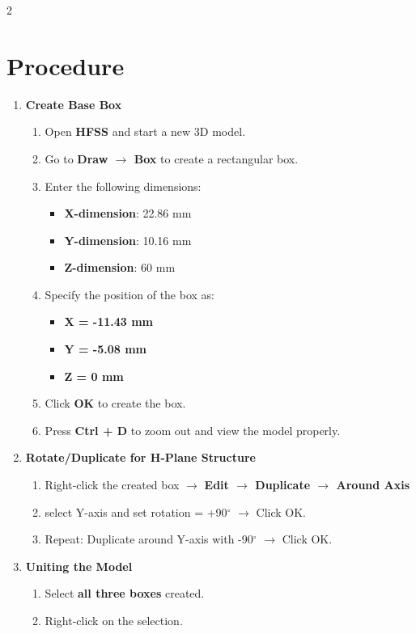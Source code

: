 \documentclass[11pt, a4paper]{article}
\begin{document}
\begin{multicols}{2}
\section*{Procedure}
\renewcommand{\labelenumii}{\alph{enumii}.}
\begin{enumerate}[leftmargin=*, itemsep=15pt]
	\item \textbf{Create Base Box}
	\begin{enumerate}
		\item Open \textbf{HFSS} and start a new 3D model.
		\item Go to \textbf{Draw $\rightarrow$ Box} to create a rectangular box.
		\item Enter the following dimensions:
		\begin{itemize}
			\item \textbf{X-dimension}: 22.86 mm
			\item \textbf{Y-dimension}: 10.16 mm
			\item \textbf{Z-dimension}: 60 mm
		\end{itemize}
		\item Specify the position of the box as:
		\begin{itemize}
			\item \textbf{X = -11.43 mm}
			\item \textbf{Y = -5.08 mm}
			\item \textbf{Z = 0 mm}
		\end{itemize}
		\item Click \textbf{OK} to create the box.
		\item Press \textbf{Ctrl + D} to zoom out and view the model properly.
	\end{enumerate}
	\item \textbf{Rotate/Duplicate for H-Plane Structure}
	\begin{enumerate}
		\item Right-click the created box $\rightarrow$ \textbf{Edit $\rightarrow$ Duplicate $\rightarrow$ Around Axis}
		\item select Y-axis and set rotation = +90$^\circ$ $\rightarrow$ Click OK.
		\item Repeat: Duplicate around Y-axis with -90$^\circ$ $\rightarrow$ Click OK.
	\end{enumerate}
	\item \textbf{Uniting the Model}
		\begin{enumerate}
			\item Select \textbf{all three boxes} created.
			\item Right-click on the selection.

\end{enumerate}
\end{enumerate}
\end{multicols}
\end{document}
